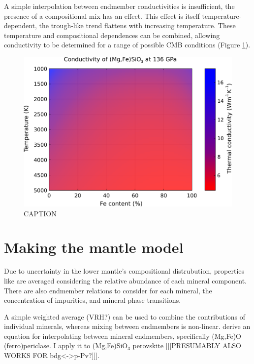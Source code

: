 A simple interpolation between endmember conductivities is insufficient, the presence of a compositional mix has an effect. This effect is itself temperature-dependent, the trough-like trend flattens with increasing temperature. These temperature and compositional dependences can be combined, allowing conductivity to be determined for a range of possible CMB conditions (Figure \ref{fig:kappa-temp-comp_01}). 

\begin{figure}[h!]
  \includegraphics[width=\linewidth]{Figures/K_over_T_over_X.png}
  \caption{CAPTION}
  \label{fig:kappa-temp-comp_01}
\end{figure}



\section{Making the mantle model}

Due to uncertainty in the lower mantle's compositional distrubution, properties like \tcs are averaged considering the relative abundance of each mineral component. There are also endmember relations to consider for each mineral, the concentration of impurities, and mineral phase transitions.  

A simple weighted average (VRH?) can be used to combine the contributions of individual minerals, whereas mixing between endmembers is non-linear. \citet{Ohta2017} derive an equation for interpolating \cs between mineral endmembers, specifically (Mg,Fe)O (ferro)periclase. I apply it to (Mg,Fe)SiO$_3$ perovskite [[[PRESUMABLY ALSO WORKS FOR bdg<->p-Pv?]]]. 

